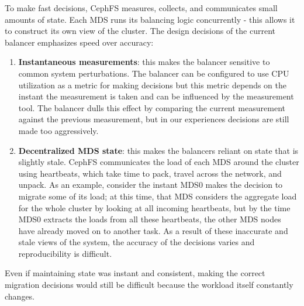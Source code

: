 To make fast decisions, CephFS measures, collects, and communicates small amounts of state. Each MDS runs its balancing logic concurrently - this allows it to construct its own view of the cluster. The design decisions of the current balancer emphasizes speed over accuracy: 
\begin{enumerate}
	\item \textbf{Instantaneous measurements}: this makes the balancer sensitive to common system perturbations. The balancer can be configured to use CPU utilization as a metric for making decisions but this metric depends on the instant the measurement is taken and can be influenced by the measurement tool. The balancer dulls this effect by comparing the current measurement against the previous measurement, but in our experiences decisions are still made too aggressively. 
	\item \textbf{Decentralized MDS state}: this makes the balancers reliant on state that is slightly stale. CephFS communicates the load of each MDS around the cluster using heartbeats, which take time to pack, travel across the network, and unpack. As an example, consider the instant MDS0 makes the decision to migrate some of its load; at this time, that MDS considers the aggregate load for the whole cluster by looking at all incoming heartbeats, but by the time MDS0 extracts the loads from all these heartbeats, the other MDS nodes have already moved on to another task. As a result of these inaccurate and stale views of the system, the accuracy of the decisions varies and reproducibility is difficult. 
\end{enumerate}

Even if maintaining state was instant and consistent, making the correct migration decisions would still be difficult because the workload itself constantly changes.

